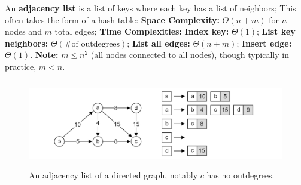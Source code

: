 \newpage
\begin{Def}

  \label{def:adj_list}
    An \textbf{adjacency list} is a list of keys where each key has a list of neighbors; This often takes the form of a hash-table:
    \textbf{Space Complexity:} $\Theta (n+m)$ for $n$ nodes and $m$ total edges; \textbf{Time Complexities:}
    \textbf{Index key:} $\Theta (1)$; \textbf{List key neighbors:} $\Theta(\text{\# of outdegrees})$; \textbf{List all edges:} $\Theta(n+m)$;
    \textbf{Insert edge:} $\Theta(1)$. \textbf{Note:} $m\leq n^2$ (all nodes connected to all nodes), though typically 
    in practice, $m < n$.
\end{Def}

\begin{figure}[h]
  \begin{center}
    \includegraphics[height=1.5in]{./Sections/graphs/adj_list.png}
  \end{center}
   \caption{An adjacency list of a directed graph, notably $c$ has no outdegrees.}\label{fig:adj_list}
\end{figure}






